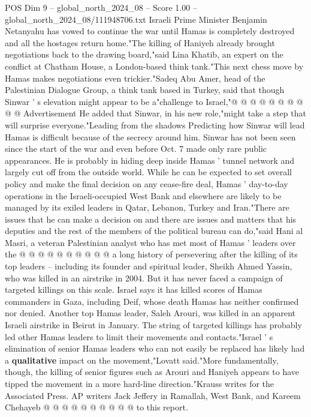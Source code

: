 \begin{textsample}{POS Dim 9 – global\_north\_2024\_08 – Score 1.00 – global\_north\_2024\_08/111948706.txt}
Israeli Prime Minister Benjamin Netanyahu has vowed to continue the war until Hamas is completely destroyed and all the hostages return home."The killing of Haniyeh already brought negotiations back to the drawing board,"said Lina Khatib, an expert on the conflict at Chatham House, a London-based think tank."This next chess move by Hamas makes negotiations even trickier."Sadeq Abu Amer, head of the Palestinian Dialogue Group, a think tank based in Turkey, said that though Sinwar ' s elevation might appear to be a"challenge to Israel,"@ @ @ @ @ @ @ @ @ @ Advertisement He added that Sinwar, in his new role,"might take a step that will surprise everyone."Leading from the shadows Predicting how Sinwar will lead Hamas is difficult because of the secrecy around him.
Sinwar has not been seen since the start of the war and even before Oct. 7 made only rare public appearances.
He is probably in hiding deep inside Hamas ' tunnel network and largely cut off from the outside world.
While he can be expected to set overall policy and make the final decision on any cease-fire deal, Hamas ' day-to-day operations in the Israeli-occupied West Bank and elsewhere are likely to be managed by its exiled leaders in Qatar, Lebanon, Turkey and Iran."There are issues that he can make a decision on and there are issues and matters that his deputies and the rest of the members of the political bureau can do,"said Hani al Masri, a veteran Palestinian analyst who has met most of Hamas ' leaders over the @ @ @ @ @ @ @ @ @ @ a long history of persevering after the killing of its top leaders -- including its founder and spiritual leader, Sheikh Ahmed Yassin, who was killed in an airstrike in 2004.
But it has never faced a campaign of targeted killings on this scale.
Israel says it has killed scores of Hamas commanders in Gaza, including Deif, whose death Hamas has neither confirmed nor denied.
Another top Hamas leader, Saleh Arouri, was killed in an apparent Israeli airstrike in Beirut in January.
The string of targeted killings has probably led other Hamas leaders to limit their movements and contacts."Israel ' s elimination of senior Hamas leaders who can not easily be replaced has likely had a \textbf{qualitative} impact on the movement,"Lovatt said."More fundamentally, though, the killing of senior figures such as Arouri and Haniyeh appears to have tipped the movement in a more hard-line direction."Krauss writes for the Associated Press.
AP writers Jack Jeffery in Ramallah, West Bank, and Kareem Chehayeb @ @ @ @ @ @ @ @ @ @ to this report.

\end{textsample}
